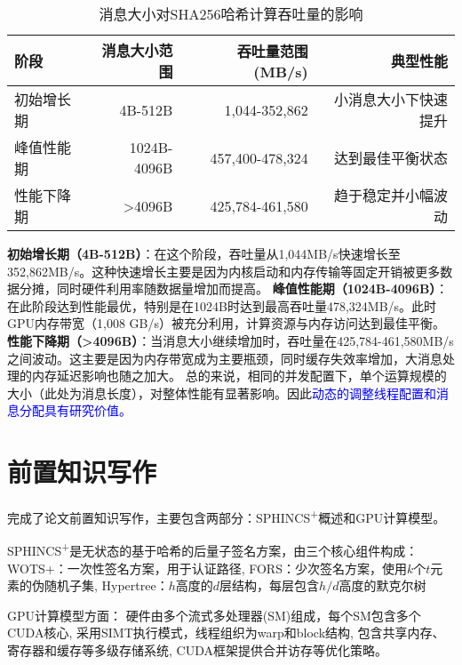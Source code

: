 \documentclass[report]{../../custom}
\begin{document}
\begin{table}[htbp]
\centering
\caption{消息大小对SHA256哈希计算吞吐量的影响}
\begin{tabular}{|l|r|r|r|}
\hline
阶段 & 消息大小范围 & 吞吐量范围 (MB/s) & 典型性能 \\
\hline
初始增长期 & 4B-512B & 1,044-352,862 & 小消息大小下快速提升 \\
峰值性能期 & 1024B-4096B & 457,400-478,324 & 达到最佳平衡状态 \\
性能下降期 & >4096B & 425,784-461,580 & 趋于稳定并小幅波动 \\
\hline
\end{tabular}
\end{table}

\textbf{初始增长期（4B-512B）}：在这个阶段，吞吐量从1,044MB/s快速增长至352,862MB/s。这种快速增长主要是因为内核启动和内存传输等固定开销被更多数据分摊，同时硬件利用率随数据量增加而提高。
\textbf{峰值性能期（1024B-4096B）}：在此阶段达到性能最优，特别是在1024B时达到最高吞吐量478,324MB/s。此时GPU内存带宽（1,008 GB/s）被充分利用，计算资源与内存访问达到最佳平衡。
\textbf{性能下降期（>4096B）}：当消息大小继续增加时，吞吐量在425,784-461,580MB/s之间波动。这主要是因为内存带宽成为主要瓶颈，同时缓存失效率增加，大消息处理的内存延迟影响也随之加大。
总的来说，相同的并发配置下，单个运算规模的大小（此处为消息长度），对整体性能有显著影响。因此\textcolor{blue}{动态的调整线程配置和消息分配具有研究价值。}

\section{前置知识写作}

完成了论文前置知识写作，主要包含两部分：SPHINCS\textsuperscript{+}概述和GPU计算模型。

SPHINCS\textsuperscript{+}是无状态的基于哈希的后量子签名方案，由三个核心组件构成：
WOTS+：一次性签名方案，用于认证路径,
FORS：少次签名方案，使用$k$个$t$元素的伪随机子集,
Hypertree：$h$高度的$d$层结构，每层包含$h/d$高度的默克尔树

GPU计算模型方面：
硬件由多个流式多处理器(SM)组成，每个SM包含多个CUDA核心,
采用SIMT执行模式，线程组织为warp和block结构,
包含共享内存、寄存器和缓存等多级存储系统,
CUDA框架提供合并访存等优化策略。



\end{document}
